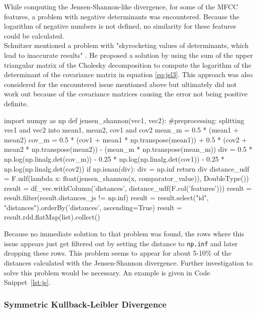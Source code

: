 While computing the Jensen-Shannon-like divergence, for some of the MFCC features, a problem with negative determinants was encountered. Because the logarithm of negative numbers is not defined, no similarity for these features could be calculated.\\ 
Schnitzer mentioned a problem with "skyrocketing values of determinants, which lead to inaccurate results" \cite[p.45]{schnitzer1}. He proposed a solution by using the sum of the upper triangular matrix of the Cholesky decomposition to compute the logarithm of the determinant of the covariance matrix in equation \eqref{eq:jsl3}. 
This approach was also considered for the encountered issue mentioned above but ultimately did not work out because of the covariance matrices causing the error not being positive definite.\\

\begin{pythonCode}[frame=single,label={lst:js},caption={Jensen-Shannon-like divergence},captionpos=b]
import numpy as np
def jensen_shannon(vec1, vec2):
	#preprocessing: splitting vec1 and vec2 into mean1, mean2, cov1 and cov2
	mean_m = 0.5 * (mean1 + mean2)
	cov_m = 0.5 * (cov1 + mean1 * np.transpose(mean1)) + 0.5 * (cov2 + mean2 * np.transpose(mean2)) - (mean_m * np.transpose(mean_m))
	div = 0.5 * np.log(np.linalg.det(cov_m)) - 0.25 * np.log(np.linalg.det(cov1)) - 0.25 * np.log(np.linalg.det(cov2))  
	if np.isnan(div):
		div = np.inf
	return div
distance_udf = F.udf(lambda x: float(jensen_shannon(x, comparator_value)), DoubleType())
result = df_vec.withColumn('distances', distance_udf(F.col('features')))
result = result.filter(result.distances_js != np.inf)    
result = result.select("id", "distances").orderBy('distances', ascending=True)
result = result.rdd.flatMap(list).collect()
\end{pythonCode}

\noindent Because no immediate solution to that problem was found, the rows where this issue appears just get filtered out by setting the distance to \lstinline{np.inf} and later dropping these rows. This problem seems to appear for about 5-10\% of the distances calculated with the Jensen-Shannon divergence. Further investigation to solve this problem would be necessary. An example is given in Code Snippet~\ref{lst:js}.

\subsubsection{Symmetric Kullback-Leibler Divergence}\label{sparkskl}

